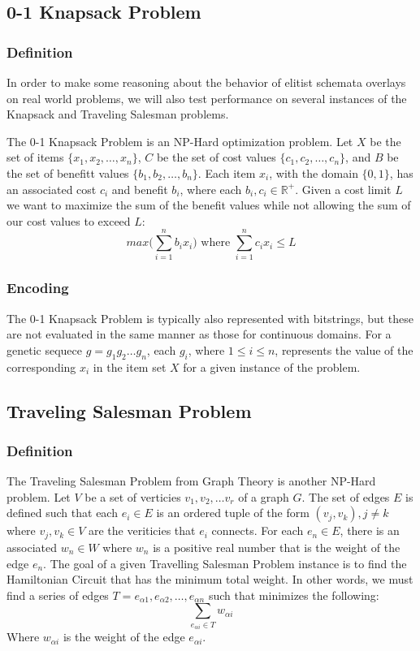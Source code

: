 %
%
\subsection*{0-1 Knapsack Problem}
\subsubsection*{Definition}

In order to make some reasoning about the behavior of elitist schemata overlays on real world problems, we will also test performance on several instances of the Knapsack and Traveling Salesman problems. 

The 0-1 Knapsack Problem is an NP-Hard optimization problem. Let $X$ be the set of items $\{x_1, x_2, \ldots, x_n\}$, $C$ be the set of cost values $\{c_1, c_2, \ldots, c_n\}$, and $B$ be the set of benefitt values $\{b_1, b_2, \ldots, b_n\}$. Each item $x_i$, with the domain $\{0,1\}$, has an associated cost $c_i$ and benefit $b_i$, where each $b_i,c_i \in \mathbb{R}^{+}$. Given a cost limit $L$ we want to maximize the sum of the benefit values while not allowing the sum of our cost values to exceed $L$:
\[ max\big( \sum\limits_{i = 1}^{n} b_ix_i \big) \text{ where } \sum\limits_{i = 1}^{n} c_ix_i \leq L \]

\subsubsection*{Encoding}
The  0-1 Knapsack Problem is typically also represented with bitstrings, but these are not evaluated in the same manner as those for continuous domains. For a genetic sequece $g = g_1 g_2 \ldots g_n$, each $g_i$, where $1 \leq i \leq n$, represents the value of the corresponding $x_i$ in the item set $X$ for a given instance of the problem. 

%
%
\subsection*{Traveling Salesman Problem}
\subsubsection*{Definition}
The Traveling Salesman Problem from Graph Theory is another NP-Hard problem. Let $V$ be a set of verticies $v_1, v_2, \ldots v_r$ of a graph $G$. The set of edges $E$ is defined such that each $e_i \in E$ is an ordered tuple of the form $(v_j,v_k), j \not = k$ where $v_j,v_k \in V$ are the veriticies that $e_i$ connects. For each $e_n \in E$, there is an associated $w_n \in W$ where $w_n$ is a positive real number that is the weight of the edge $e_n$. The goal of a given Travelling Salesman Problem instance is to find the Hamiltonian Circuit that has the minimum total weight. In other words, we must find a series of edges $T = e_{\alpha 1},e_{\alpha 2},\ldots,e_{\alpha n}$ such that minimizes the following\cite{Haxhimusa11}:
\[\sum\limits_{e_{\alpha i} \in T} w_{\alpha i}\]
\noindent Where $w_{\alpha i}$ is the weight of the edge $e_{\alpha i}$.


